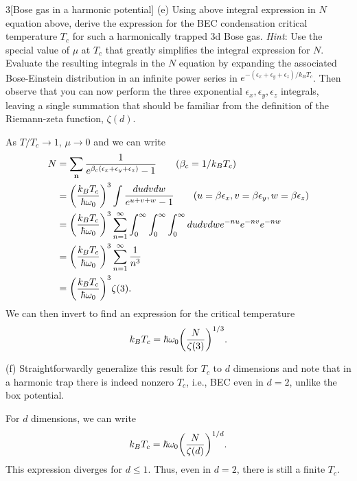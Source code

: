 \documentclass[12pt]{article}
\begin{document}
\begin{problem}{3}[Bose gas in a harmonic potential]
(e) Using above integral expression in $N$ equation above, derive the expression
for the BEC condensation critical temperature $T_c$ for such a harmonically
trapped 3d Bose gas.
\textit{Hint}: Use the special value of $\mu$ at $T_c$ that greatly simplifies
the integral expression for $N$. Evaluate the resulting integrals in the $N$
equation by expanding the associated Bose-Einstein distribution in an infinite
power series in $e^{-(\epsilon_x+\epsilon_y+\epsilon_z)/k_BT_c}$. Then observe
that you can now perform the three exponential
$\epsilon_x,\epsilon_y,\epsilon_z$ integrals, leaving a single summation that
should be familiar from the definition of the Riemann-zeta function, $\zeta(d)$.
\begin{solution}
As $T/T_c\to 1$, $\mu\to0$ and we can write
\begin{align}
    N&=\sum_{\vb{n}}\frac1{e^{\beta_c(\epsilon_x+\epsilon_y+\epsilon_z)}-1}\tag{$\beta_c=1/k_BT_c$}\\
     &=\qty(\frac{k_BT_c}{\hbar\omega_0})^3\int\frac{dudvdw}{e^{u+v+w}-1}\tag{$u=\beta\epsilon_x,v=\beta\epsilon_y,w=\beta\epsilon_z$}\\
     &=\qty(\frac{k_BT_c}{\hbar\omega_0})^3\sum_{n=1}^\infty\int_0^\infty\int_0^\infty\int_0^\infty
     dudvdw e^{-nu}e^{-nv}e^{-nw}\notag\\
     &=\qty(\frac{k_BT_c}{\hbar\omega_0})^3\sum_{n=1}^\infty\frac1{n^3}\notag\\
     &=\qty(\frac{k_BT_c}{\hbar\omega_0})^3\zeta(3).
\end{align}
We can then invert to find an expression for the critical temperature
\begin{equation}
    k_BT_c=\hbar\omega_0\qty(\frac{N}{\zeta(3)})^{1/3}. 
\end{equation}
\end{solution}

(f) Straightforwardly generalize this result for $T_c$ to $d$ dimensions and
note that in a harmonic trap there is indeed nonzero $T_c$, i.e., BEC even in
$d=2$, unlike the box potential.
\begin{solution}
    For $d$ dimensions, we can write
    \begin{equation}
        k_BT_c=\hbar\omega_0\qty(\frac{N}{\zeta(d)})^{1/d}. 
    \end{equation}
This expression diverges for $d\leq 1$. Thus, even in $d=2$, there is still a
finite $T_c$.
\end{solution}


\end{problem}
\end{document}
